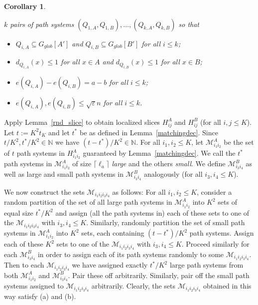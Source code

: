 \documentclass{memo-l}
\newtheorem{cor}[firstthm]{Corollary}
\def\proof{\removelastskip\penalty55\medskip\noindent{\bf Proof. }}
\def\cM{\mathcal{M}}
\def\eps{\varepsilon}
\numberwithin{section}{chapter}
\numberwithin{equation}{section}
\numberwithin{firstthm}{section}
\numberwithin{figure}{section}
\begin{document}
{\begin{cor}
\begin{itemize}
$k$ pairs of path systems $(Q_{1,A},Q_{1,B}),\dots,(Q_{k,A},Q_{k,B})$ so that
\begin{itemize}
\item[{\rm (i$'$)}] $Q_{i,A}\subseteq G_{glob}[A']$ and $Q_{i,B}\subseteq G_{glob}[B']$ for all $i \le k$;
\item[\rm{(ii$'$)}] $d_{Q_{i,A}}(x)\le 1$ for all $x\in A$ and $d_{Q_{i,B}}(x)\le 1$ for all $x\in B$;
\item[\rm{(iii$'$)}] $e(Q_{i,A})-e(Q_{i,B})=a-b$ for all $i \le k$;
\item[\rm{(iv$'$)}] $e(Q_{i,A}),e(Q_{i,B}) \le \sqrt{\eps}n$ for all $i \le k$.
\end{itemize}
\end{itemize}
\end{cor}
\proof
Apply Lemma~\ref{rnd_slice} to obtain localized slices $H^A_{ij}$ and $H^B_{ij}$ (for all $i,j\le K$).
Let $t:=K^2 t_K$ and let $t^*$ be as defined in Lemma~\ref{matchingdec}. Since $t/K^2, t^*/K^2\in\mathbb{N}$ we have $(t-t^*)/K^2\in\mathbb{N}$.
For all $i_1,i_2\le K$, let $\cM_{i_1i_2}^A$ be the set of $t$ path systems  in $H_{i_1i_2}^A$ guaranteed by Lemma~\ref{matchingdec}.
We call the $t^*$ path systems in $\cM_{i_1i_2}^A$ of size $\lceil \ell_a \rceil$ \emph{large} and the others \emph{small}.
We define $\cM_{i_3i_4}^B$ as well as large and small path systems in $\cM_{i_3i_4}^B$ analogously (for all $i_3,i_4 \leq K$).

We now construct the sets $\cM_{i_1i_2i_3i_4}$ as follows:
For all $i_1,i_2 \le K$, 
consider a random partition of the set of all large path systems in $\cM_{i_1i_2}^A$ into $K^2$ sets of equal size $t^*/K^2$ and assign
(all the path systems in) each of these sets to 
one of the $\cM_{i_1i_2i_3i_4}$ with $i_3,i_4 \le K$.
Similarly, randomly partition the set of small path systems in $\cM_{i_1i_2}^A$ into $K^2$ sets, each containing $(t-t^*)/K^2$ path systems.
Assign each of these $K^2$ sets to one of the $\cM_{i_1i_2i_3i_4}$ with $i_3,i_4 \le K$.
Proceed similarly for each $\cM_{i_3i_4}^B$ in order to assign each of its path systems randomly to some $\cM_{i_1i_2i_3i_4}$.
Then to each $\cM_{i_1i_2i_3i_4}$ we have assigned exactly $t^*/K^2$ large path systems from both $\cM_{i_1i_2}^A$ and $\cM_{i_3i_4}^B$.
Pair these off arbitrarily. Similarly, pair off the small path systems assigned to $\cM_{i_1i_2i_3i_4}$ arbitrarily.
Clearly, the sets $\cM_{i_1i_2i_3i_4}$ obtained in this way satisfy (a) and (b).

}
\end{document}

